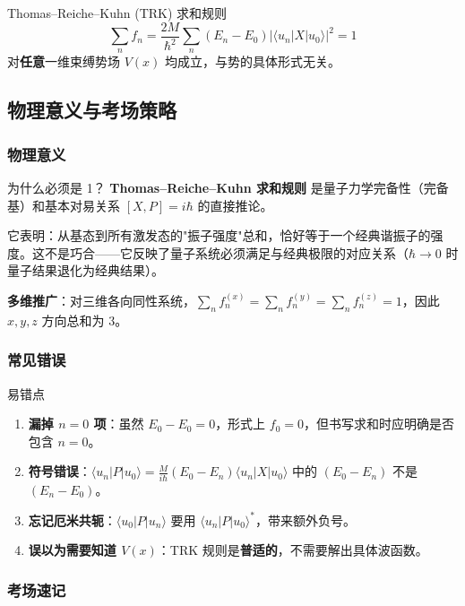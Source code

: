 \begin{formulabox}{Thomas–Reiche–Kuhn (TRK) 求和规则}
\[
  \boxed{\sum_n f_n = \frac{2M}{\hbar^2}\sum_n (E_n-E_0)\bigl|\langle u_n|X|u_0\rangle\bigr|^2 = 1}
\]
对\textbf{任意}一维束缚势场 $V(x)$ 均成立，与势的具体形式无关。
\end{formulabox}


\subsection{物理意义与考场策略}

\subsubsection{物理意义}

\begin{insightbox}{为什么必须是 1？}
\textbf{Thomas–Reiche–Kuhn 求和规则} 是量子力学完备性（完备基）和基本对易关系 $[X,P]=i\hbar$ 的直接推论。

它表明：从基态到所有激发态的"振子强度"总和，恰好等于一个经典谐振子的强度。这不是巧合——它反映了量子系统必须满足与经典极限的对应关系（$\hbar\to 0$ 时量子结果退化为经典结果）。

\textbf{多维推广}：对三维各向同性系统，$\sum_n f_n^{(x)} = \sum_n f_n^{(y)} = \sum_n f_n^{(z)} = 1$，因此 $x,y,z$ 方向总和为 3。
\end{insightbox}

\subsubsection{常见错误}

\begin{errorbox}{易错点}
\begin{enumerate}
  \item \textbf{漏掉 $n=0$ 项}：虽然 $E_0-E_0=0$，形式上 $f_0=0$，但书写求和时应明确是否包含 $n=0$。
  \item \textbf{符号错误}：$\langle u_n|P|u_0\rangle = \frac{M}{i\hbar}(E_0-E_n)\langle u_n|X|u_0\rangle$ 中的 $(E_0-E_n)$ 不是 $(E_n-E_0)$。
  \item \textbf{忘记厄米共轭}：$\langle u_0|P|u_n\rangle$ 要用 $\langle u_n|P|u_0\rangle^*$，带来额外负号。
  \item \textbf{误以为需要知道 $V(x)$}：TRK 规则是\textbf{普适的}，不需要解出具体波函数。
\end{enumerate}
\end{errorbox}

\subsubsection{考场速记}

